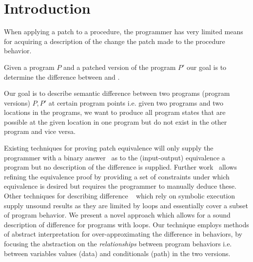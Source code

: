\section{Introduction} 



When applying a patch to a procedure, the programmer has very limited means
for acquiring a description of the change the patch made to the procedure
behavior.

Given a program $P$ and a patched version of the program $P'$ our goal is to
determine the difference between  and .

Our goal is to describe semantic difference between two programs (program versions) $P,P'$ at certain program points
i.e. given two programs and two locations in the programs, we want to produce all program states that are possible at the given location in one program but do not exist in the other program and vice versa.

Existing techniques for proving patch equivalence will only supply the
programmer with a binary answer~\cite{GodlinStrichman09} as to the
(input-output) equivalence a program but no description of the difference is
supplied. Further work~\cite{KawaguchiLahiriRebelo10} allows refining the
equivalence proof by providing a set of constraints under which equivalence
is desired but requires the programmer to manually deduce these. Other
techniques for describing difference
~\cite{DwyerElbaumPerson08,HawblitzelKawaguchiLahiriRebelo12} which rely on
symbolic execution supply unsound results as they are limited by loops and
essentially cover a subset of program behavior. We present a novel approach
which allows for a sound description of difference for programs with loops.
Our technique employs methods of abstract interpretation for
over-approximating the difference in behaviors, by focusing the abstraction
on the \emph{relationships} between program behaviors i.e. between variables
values (data) and conditionals (path) in the two versions.

